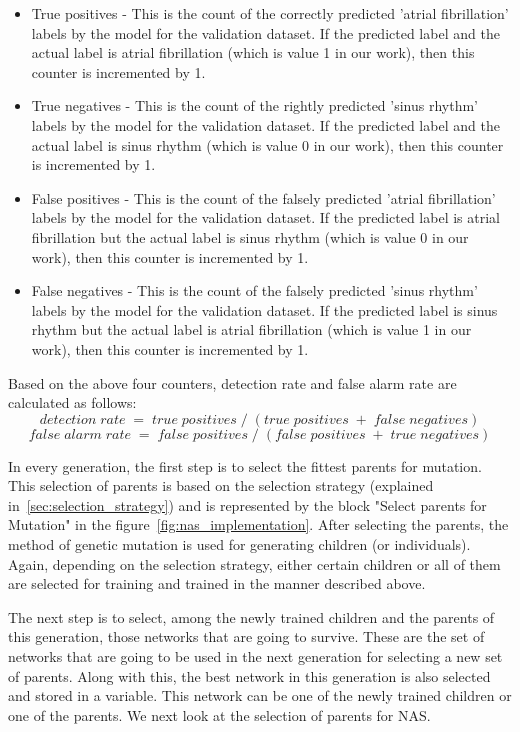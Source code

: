 \begin{itemize}
    \item True positives - This is the count of the correctly predicted 'atrial fibrillation' labels by the model for the validation dataset. If the predicted label and the actual label is atrial fibrillation (which is value 1 in our work), then this counter is incremented by 1.
    \item True negatives - This is the count of the rightly predicted 'sinus rhythm' labels by the model for the validation dataset. If the predicted label and the actual label is sinus rhythm (which is value 0 in our work), then this counter is incremented by 1.
    \item False positives - This is the count of the falsely predicted 'atrial fibrillation' labels by the model for the validation dataset. If the predicted label is atrial fibrillation but the actual label is sinus rhythm (which is value 0 in our work), then this counter is incremented by 1.
    \item False negatives - This is the count of the falsely predicted 'sinus rhythm' labels by the model for the validation dataset. If the predicted label is sinus rhythm but the actual label is atrial fibrillation (which is value 1 in our work), then this counter is incremented by 1.
\end{itemize}

Based on the above four counters, detection rate and false alarm rate are calculated as follows:
\[ detection \; rate \; = \; true \; positives \; / \; (true \; positives \; + \; false \; negatives) \]
\[ false \; alarm \; rate \; = \; false \; positives \; / \; (false \; positives \; + \; true \; negatives) \]

In every generation, the first step is to select the fittest parents for mutation. This selection of parents is based on the selection strategy (explained in~\autoref{sec:selection_strategy}) and is represented by the block "Select parents for Mutation" in the figure~\ref{fig:nas_implementation}. After selecting the parents, the method of genetic mutation is used for generating children (or individuals). Again, depending on the selection strategy, either certain children or all of them are selected for training and trained in the manner described above. 

The next step is to select, among the newly trained children and the parents of this generation, those networks that are going to survive. These are the set of networks that are going to be used in the next generation for selecting a new set of parents. Along with this, the best network in this generation is also selected and stored in a variable. This network can be one of the newly trained children or one of the parents. We next look at the selection of parents for NAS.

